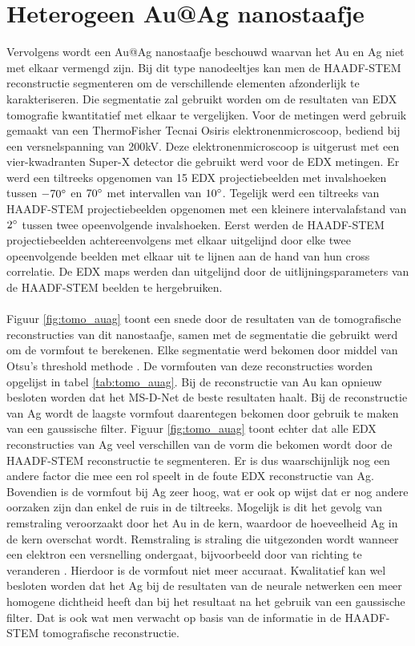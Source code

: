 \documentclass{report}
\begin{document}
\section{Heterogeen Au@Ag nanostaafje} \label{ch:tomo_auag}
Vervolgens wordt een Au@Ag nanostaafje beschouwd waarvan het Au en Ag niet met elkaar vermengd zijn. Bij dit type nanodeeltjes kan men de HAADF-STEM reconstructie segmenteren om de verschillende elementen afzonderlijk te karakteriseren. Die segmentatie zal gebruikt worden om de resultaten van EDX tomografie kwantitatief met elkaar te vergelijken. Voor de metingen werd gebruik gemaakt van een ThermoFisher Tecnai Osiris elektronenmicroscoop, bediend bij een versnelspanning van 200kV. Deze elektronenmicroscoop is uitgerust met een vier-kwadranten Super-X detector die gebruikt werd voor de EDX metingen. Er werd een tiltreeks opgenomen van 15 EDX projectiebeelden met invalshoeken tussen $-70\degree$ en $70\degree$ met intervallen van $10\degree$. Tegelijk werd een tiltreeks van HAADF-STEM projectiebeelden opgenomen met een kleinere intervalafstand van $2\degree$ tussen twee opeenvolgende invalshoeken. Eerst werden de HAADF-STEM projectiebeelden achtereenvolgens met elkaar uitgelijnd door elke twee opeenvolgende beelden met elkaar uit te lijnen aan de hand van hun cross correlatie. De EDX maps werden dan uitgelijnd door de uitlijningsparameters van de HAADF-STEM beelden te hergebruiken.
\\ \\
Figuur \ref{fig:tomo_auag} toont een snede door de resultaten van de tomografische reconstructies van dit nanostaafje, samen met de segmentatie die gebruikt werd om de vormfout te berekenen. Elke segmentatie werd bekomen door middel van Otsu's threshold methode \cite{paper:otsu}. De vormfouten van deze reconstructies worden opgelijst in tabel \ref{tab:tomo_auag}. Bij de reconstructie van Au kan opnieuw besloten worden dat het MS-D-Net de beste resultaten haalt. Bij de reconstructie van Ag wordt de laagste vormfout daarentegen bekomen door gebruik te maken van een gaussische filter. Figuur \ref{fig:tomo_auag} toont echter dat alle EDX reconstructies van Ag veel verschillen van de vorm die bekomen wordt door de HAADF-STEM reconstructie te segmenteren. Er is dus waarschijnlijk nog een andere factor die mee een rol speelt in de foute EDX reconstructie van Ag. Bovendien is de vormfout bij Ag zeer hoog, wat er ook op wijst dat er nog andere oorzaken zijn dan enkel de ruis in de tiltreeks. Mogelijk is dit het gevolg van remstraling veroorzaakt door het Au in de kern, waardoor de hoeveelheid Ag in de kern overschat wordt. Remstraling is straling die uitgezonden wordt wanneer een elektron een versnelling ondergaat, bijvoorbeeld door van richting te veranderen \cite{book:williamscarter}. Hierdoor is de vormfout niet meer accuraat. Kwalitatief kan wel besloten worden dat het Ag bij de resultaten van de neurale netwerken een meer homogene dichtheid heeft dan bij het resultaat na het gebruik van een gaussische filter. Dat is ook wat men verwacht op basis van de informatie in de HAADF-STEM tomografische reconstructie.
\end{document}
